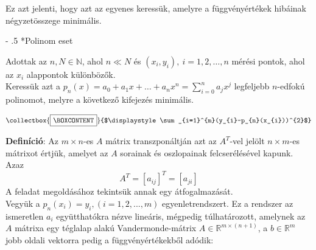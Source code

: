\documentclass[tikz,12pt,margin=0px]{article}
\makeatletter
\newcommand{\mybox}{%
    \collectbox{%
        \setlength{\fboxsep}{4pt}%
        \fbox{\BOXCONTENT}%
    }%
}
\renewcommand\paragraph{%
	\@startsection{paragraph}{4}{0mm}%
	{-\baselineskip}%
	{.5\baselineskip}%
	{\normalfont\normalsize\bfseries}}
\makeatother
\begin{document}
	\noindent Ez azt jelenti, hogy azt az egyenes keressük, amelyre a függvényértékek hibáinak
	négyzetösszege minimális.
	
    \paragraph*{Polinom eset\\}

	\noindent Adottak az $n, N \in \mathbb{N}$, ahol $n \ll N$ és $(x_{i},y_{i}),\ i= 1,2,\ldots,n$ mérési pontok, ahol az $x_{i}$
	alappontok különbözők.\\
    \noindent Keressük azt a $p_{n}(x) = a_{0} + a_{1}x + \ldots + a_{n}x^{n} = \sum\limits_{i=0}^{n}a_{j}x^{j}$ legfeljebb $n$-edfokú polinomot, melyre a következő kifejezés minimális.

	\begin{displaymath}
	   \mybox{$\displaystyle\sum_{i=1}^{m}(y_{i}-p_{n}(x_{i}))^{2}$}
	\end{displaymath}

    {\footnotesize
    \noindent \textbf{Definíció}: Az $m \times n$-es $A$ mátrix transzponáltján azt az $A^{T}$-vel jelölt $n \times m$-es mátrixot értjük, amelyet az $A$ sorainak és oszlopainak felcserélésével kapunk. Azaz
    \[
        A^{T} = [a_{ij}]^{T} = [a_{ji}]
    \]
    }
	\noindent A feladat megoldásához tekintsük annak egy átfogalmazását.\\
	
	\noindent Vegyük a $p_{n}(x_{i}) = y_{i}, (i=1,2,...,m)$ egyenletrendszert. Ez a rendszer az ismeretlen $a_{i}$ együtthatókra nézve
	lineáris, mégpedig túlhatározott, amelynek az $A$ mátrixa egy téglalap alakú Vandermonde-mátrix $A \in \mathbb{R}^{m \times (n+1)}$,
	a $b \in \mathbb{R}^{m}$ jobb oldali vektorra pedig a függvényértékekből adódik:
	
\end{document}

